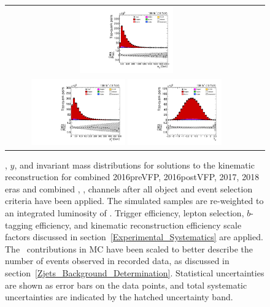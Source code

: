 \begin{figure}[htb]
    \begin{center}
        \begin{tabular}{ccc}
            \includegraphics[width=0.40\textwidth]{fig_fullRun2UL/controlplots/combined/HypTTBarMass.pdf} \\
            \includegraphics[width=0.40\textwidth]{fig_fullRun2UL/controlplots/combined/HypTTBarpT.pdf} 
            \includegraphics[width=0.40\textwidth]{fig_fullRun2UL/controlplots/combined/HypTTBarRapidity.pdf} \\
        \end{tabular}
        \caption{\footnotesize \pT, $y$, and invariant mass distributions for \ttbar solutions to the kinematic reconstruction for combined 2016preVFP, 2016postVFP, 2017, 2018 eras and combined \ee, \emu, \mumu channels after all object and event selection criteria have been applied.
        The simulated samples are re-weighted to an integrated luminosity of \lumivalueRuniiUL.
        Trigger efficiency, lepton selection, $b$-tagging efficiency, and kinematic reconstruction efficiency scale factors discussed in section~\ref{Experimental_Systematics} are applied.
        The \zjets\ contributions in MC have been scaled to better describe the number of events observed in recorded data, as discussed in section~\ref{Zjets_Background_Determination}.
        Statistical uncertainties are shown as error bars on the data points, and total systematic uncertainties are indicated by the hatched uncertainty band.
        }
        \label{ttbar_control}
    \end{center}
\end{figure}

